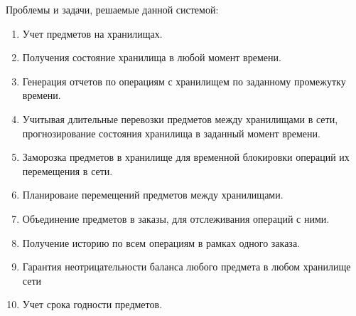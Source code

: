 Проблемы и задачи, решаемые данной системой:

\begin{enumerate}
  \item Учет предметов на хранилищах.
  
  \item Получения состояние хранилища в любой момент времени.
  
  \item Генерация отчетов по операциям с хранилищем по заданному
        промежутку времени.
        
  \item Учитывая длительные перевозки предметов между хранилищами
        в сети, прогнозирование состояния хранилища в заданный 
        момент времени.

  \item Заморозка предметов в хранилище для временной блокировки 
        операций их перемещения в сети.
      
  \item Планироваие перемещений предметов между хранилищами.
  
  \item Объединение предметов в заказы, для отслеживания операций 
        с ними.

  \item Получение историю по всем операциям в рамках одного заказа.
  
  \item Гарантия неотрицательности баланса любого предмета в
        любом хранилище сети

  \item Учет срока годности предметов.
\end{enumerate}